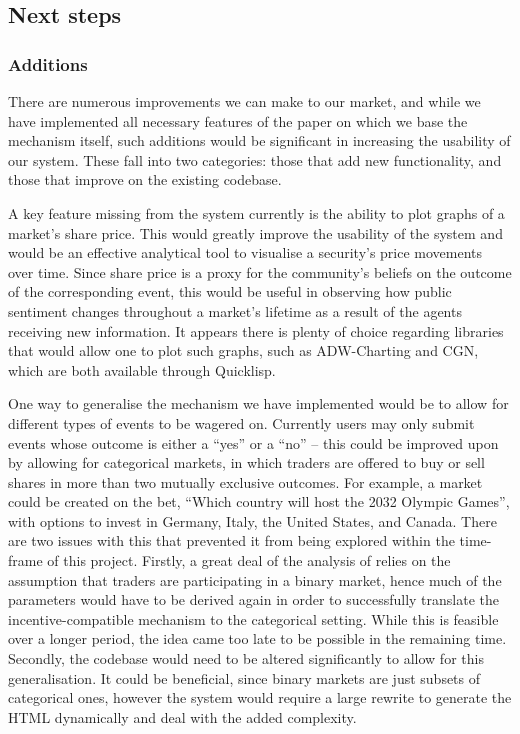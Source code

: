 \subsection{Next steps}

\subsubsection{Additions}

There are numerous improvements we can make to our market, and while we have
implemented all necessary features of the paper on which we base the mechanism
itself, such additions would be significant in increasing the usability of our
system. These fall into two categories: those that add new functionality, and
those that improve on the existing codebase.

A key feature missing from the system currently is the ability to plot graphs
of a market's share price. This would greatly improve the usability of the
system and would be an effective analytical tool to visualise a security's
price movements over time. Since share price is a proxy for the community's
beliefs on the outcome of the corresponding event, this would be useful in
observing how public sentiment changes throughout a market's lifetime as a
result of the agents receiving new information. It appears there is plenty of
choice regarding libraries that would allow one to plot such graphs, such as
ADW-Charting and CGN, which are both available through Quicklisp.

One way to generalise the mechanism we have implemented would be to allow for
different types of events to be wagered on. Currently users may only submit
events whose outcome is either a ``yes'' or a ``no'' -- this could be improved
upon by allowing for categorical markets, in which traders are offered to
buy or sell shares in more than two mutually exclusive outcomes. For example, a
market could be created on the bet, ``Which country will host the 2032 Olympic Games'',
with options to invest in Germany, Italy, the United States, and Canada. There
are two issues with this that prevented it from being explored within the
time-frame of this project. Firstly, a great deal of the analysis of
\cite{Freeman2017} relies on the assumption that traders are participating in a
binary market, hence much of the parameters would have to be derived again in
order to successfully translate the incentive-compatible mechanism to the
categorical setting. While this is feasible over a longer period, the idea came
too late to be possible in the remaining time. Secondly, the codebase would
need to be altered significantly to allow for this generalisation. It could be
beneficial, since binary markets are just subsets of categorical ones, however
the system would require a large rewrite to generate the HTML dynamically and
deal with the added complexity.

